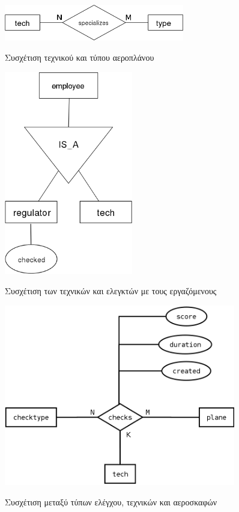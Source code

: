 \documentclass[a4paper]{article}
\begin{document}
\begin{figure}[h]
\centering
\includegraphics[width=0.7\textwidth]{../ER_model/aviation_relations_1a.png}\\
\caption{Συσχέτιση τεχνικού και τύπου αεροπλάνου}
\end{figure}

\begin{figure}[h]
\centering
\includegraphics[width=0.5\textwidth]{../ER_model/aviation_relations_1b.png}\\
\caption{Συσχέτιση των τεχνικών και ελεγκτών με τους εργαζόμενους}
\end{figure}

\begin{figure}[h]
\centering
\includegraphics[width=0.9\textwidth]{../ER_model/aviation_relations_2.png}\\
\caption{Συσχέτιση μεταξύ τύπων ελέγχου, τεχνικών και αεροσκαφών}
\end{figure}
\pagebreak
\end{document}
